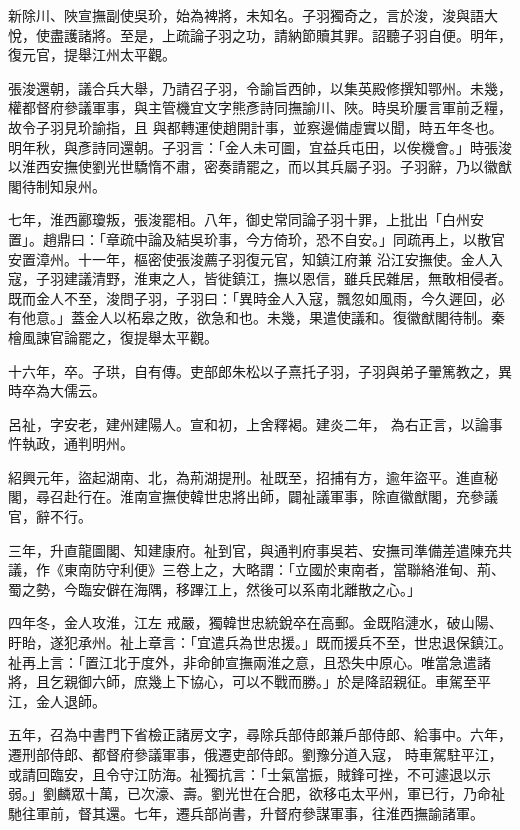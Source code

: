 \begin{pinyinscope}
 新除川、陜宣撫副使吳玠，始為裨將，未知名。子羽獨奇之，言於浚，浚與語大悅，使盡護諸將。至是，上疏論子羽之功，請納節贖其罪。詔聽子羽自便。明年，復元官，提舉江州太平觀。



 張浚還朝，議合兵大舉，乃請召子羽，令諭旨西帥，以集英殿修撰知鄂州。未幾，權都督府參議軍事，與主管機宜文字熊彥詩同撫諭川、陜。時吳玠屢言軍前乏糧，故令子羽見玠諭指，且
 與都轉運使趙開計事，並察邊備虛實以聞，時五年冬也。明年秋，與彥詩同還朝。子羽言：「金人未可圖，宜益兵屯田，以俟機會。」時張浚以淮西安撫使劉光世驕惰不肅，密奏請罷之，而以其兵屬子羽。子羽辭，乃以徽猷閣待制知泉州。



 七年，淮西酈瓊叛，張浚罷相。八年，御史常同論子羽十罪，上批出「白州安置」。趙鼎曰：「章疏中論及結吳玠事，今方倚玠，恐不自安。」同疏再上，以散官安置漳州。十一年，樞密使張浚薦子羽復元官，知鎮江府兼
 沿江安撫使。金人入寇，子羽建議清野，淮東之人，皆徙鎮江，撫以恩信，雖兵民雜居，無敢相侵者。既而金人不至，浚問子羽，子羽曰：「異時金人入寇，飄忽如風雨，今久遲回，必有他意。」蓋金人以柘皋之敗，欲急和也。未幾，果遣使議和。復徽猷閣待制。秦檜風諫官論罷之，復提舉太平觀。



 十六年，卒。子珙，自有傳。吏部郎朱松以子熹托子羽，子羽與弟子翬篤教之，異時卒為大儒云。



 呂祉，字安老，建州建陽人。宣和初，上舍釋褐。建炎二年，
 為右正言，以論事忤執政，通判明州。



 紹興元年，盜起湖南、北，為荊湖提刑。祉既至，招捕有方，逾年盜平。進直秘閣，尋召赴行在。淮南宣撫使韓世忠將出師，闢祉議軍事，除直徽猷閣，充參議官，辭不行。



 三年，升直龍圖閣、知建康府。祉到官，與通判府事吳若、安撫司準備差遣陳充共議，作《東南防守利便》三卷上之，大略謂：「立國於東南者，當聯絡淮甸、荊、蜀之勢，今臨安僻在海隅，移蹕江上，然後可以系南北離散之心。」



 四年冬，金人攻淮，江左
 戒嚴，獨韓世忠統銳卒在高郵。金既陷漣水，破山陽、盱眙，遂犯承州。祉上章言：「宜遣兵為世忠援。」既而援兵不至，世忠退保鎮江。祉再上言：「置江北于度外，非命帥宣撫兩淮之意，且恐失中原心。唯當急遣諸將，且乞親御六師，庶幾上下協心，可以不戰而勝。」於是降詔親征。車駕至平江，金人退師。



 五年，召為中書門下省檢正諸房文字，尋除兵部侍郎兼戶部侍郎、給事中。六年，遷刑部侍郎、都督府參議軍事，俄遷吏部侍郎。劉豫分道入寇，
 時車駕駐平江，或請回臨安，且令守江防海。祉獨抗言：「士氣當振，賊鋒可挫，不可遽退以示弱。」劉麟眾十萬，已次濠、壽。劉光世在合肥，欲移屯太平州，軍已行，乃命祉馳往軍前，督其還。七年，遷兵部尚書，升督府參謀軍事，往淮西撫諭諸軍。




\end{pinyinscope}
